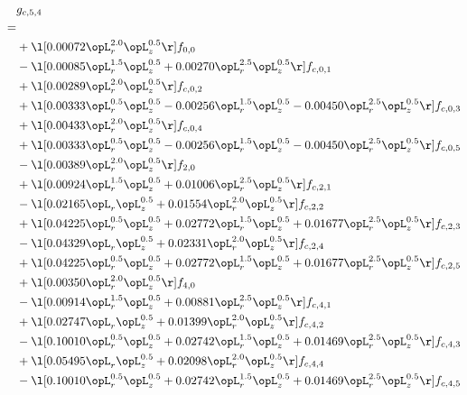 \begin{alignat}{2} 
\label{eq:g_54_0} 
& g_{c,5,4} \nonumber \\ 
 = \\ 
& + \l[  0.00072 \opL_r^{2.0} \opL_z^{0.5}  \r] f_{0,0} \nonumber \\ 
& - \l[  0.00085 \opL_r^{1.5} \opL_z^{0.5} +  0.00270 \opL_r^{2.5} \opL_z^{0.5}  \r] f_{c,0,1} \nonumber \\ 
& + \l[  0.00289 \opL_r^{2.0} \opL_z^{0.5}  \r] f_{c,0,2} \nonumber \\ 
& + \l[  0.00333 \opL_r^{0.5} \opL_z^{0.5}   -0.00256 \opL_r^{1.5} \opL_z^{0.5}   -0.00450 \opL_r^{2.5} \opL_z^{0.5}  \r] f_{c,0,3} \nonumber \\ 
& + \l[  0.00433 \opL_r^{2.0} \opL_z^{0.5}  \r] f_{c,0,4} \nonumber \\ 
& + \l[  0.00333 \opL_r^{0.5} \opL_z^{0.5}   -0.00256 \opL_r^{1.5} \opL_z^{0.5}   -0.00450 \opL_r^{2.5} \opL_z^{0.5}  \r] f_{c,0,5} \nonumber \\ 
& - \l[  0.00389 \opL_r^{2.0} \opL_z^{0.5}  \r] f_{2,0} \nonumber \\ 
& + \l[  0.00924 \opL_r^{1.5} \opL_z^{0.5} +  0.01006 \opL_r^{2.5} \opL_z^{0.5}  \r] f_{c,2,1} \nonumber \\ 
& - \l[  0.02165 \opL_r \opL_z^{0.5} +  0.01554 \opL_r^{2.0} \opL_z^{0.5}  \r] f_{c,2,2} \nonumber \\ 
& + \l[  0.04225 \opL_r^{0.5} \opL_z^{0.5} +  0.02772 \opL_r^{1.5} \opL_z^{0.5} +  0.01677 \opL_r^{2.5} \opL_z^{0.5}  \r] f_{c,2,3} \nonumber \\ 
& - \l[  0.04329 \opL_r \opL_z^{0.5} +  0.02331 \opL_r^{2.0} \opL_z^{0.5}  \r] f_{c,2,4} \nonumber \\ 
& + \l[  0.04225 \opL_r^{0.5} \opL_z^{0.5} +  0.02772 \opL_r^{1.5} \opL_z^{0.5} +  0.01677 \opL_r^{2.5} \opL_z^{0.5}  \r] f_{c,2,5} \nonumber \\ 
& + \l[  0.00350 \opL_r^{2.0} \opL_z^{0.5}  \r] f_{4,0} \nonumber \\ 
& - \l[  0.00914 \opL_r^{1.5} \opL_z^{0.5} +  0.00881 \opL_r^{2.5} \opL_z^{0.5}  \r] f_{c,4,1} \nonumber \\ 
& + \l[  0.02747 \opL_r \opL_z^{0.5} +  0.01399 \opL_r^{2.0} \opL_z^{0.5}  \r] f_{c,4,2} \nonumber \\ 
& - \l[  0.10010 \opL_r^{0.5} \opL_z^{0.5} +  0.02742 \opL_r^{1.5} \opL_z^{0.5} +  0.01469 \opL_r^{2.5} \opL_z^{0.5}  \r] f_{c,4,3} \nonumber \\ 
& + \l[  0.05495 \opL_r \opL_z^{0.5} +  0.02098 \opL_r^{2.0} \opL_z^{0.5}  \r] f_{c,4,4} \nonumber \\ 
& - \l[  0.10010 \opL_r^{0.5} \opL_z^{0.5} +  0.02742 \opL_r^{1.5} \opL_z^{0.5} +  0.01469 \opL_r^{2.5} \opL_z^{0.5}  \r] f_{c,4,5} \nonumber \\ 
\end{alignat} 


